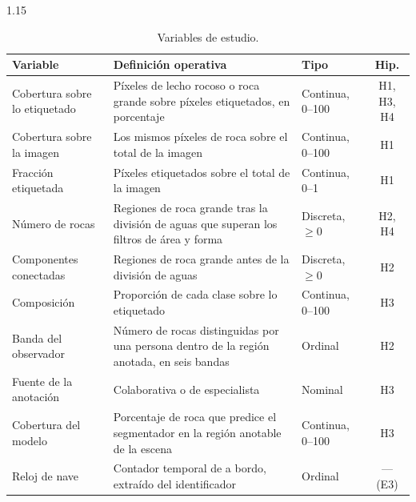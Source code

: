 \begin{table}[htbp]
  \centering
  \small
  \begin{spacing}{1.15}
  \caption{Variables de estudio.}
  \label{tab:variables}
  \begin{tabular}{>{\raggedright\arraybackslash}p{3.6cm}>{\raggedright\arraybackslash}p{6.4cm}>{\raggedright\arraybackslash}p{2.6cm}c}
    \toprule
    \textbf{Variable} & \textbf{Definición operativa} & \textbf{Tipo} & \textbf{Hip.} \\
    \midrule
    Cobertura sobre lo etiquetado & Píxeles de lecho rocoso o roca grande sobre píxeles
      etiquetados, en porcentaje & Continua, 0--100 & H1, H3, H4 \\
    Cobertura sobre la imagen & Los mismos píxeles de roca sobre el total de la imagen &
      Continua, 0--100 & H1 \\
    Fracción etiquetada & Píxeles etiquetados sobre el total de la imagen & Continua, 0--1 & H1 \\
    Número de rocas & Regiones de roca grande tras la división de aguas que superan los filtros
      de área y forma & Discreta, $\geq 0$ & H2, H4 \\
    Componentes conectadas & Regiones de roca grande antes de la división de aguas &
      Discreta, $\geq 0$ & H2 \\
    Composición & Proporción de cada clase sobre lo etiquetado & Continua, 0--100 & H3 \\
    Banda del observador & Número de rocas distinguidas por una persona dentro de la región
      anotada, en seis bandas & Ordinal & H2 \\
    Fuente de la anotación & Colaborativa o de especialista & Nominal & H3 \\
    Cobertura del modelo & Porcentaje de roca que predice el segmentador en la región anotable
      de la escena & Continua, 0--100 & H3 \\
    Reloj de nave & Contador temporal de a bordo, extraído del identificador & Ordinal & --- (E3) \\
    \bottomrule
  \end{tabular}
  \end{spacing}
\end{table}
